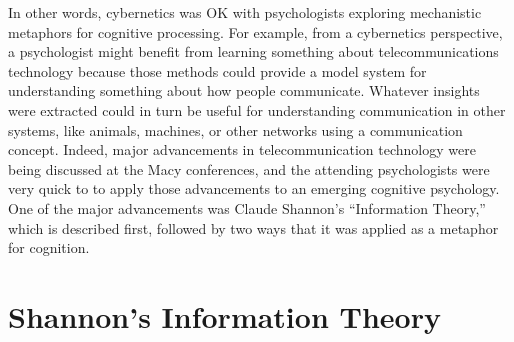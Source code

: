 \documentclass[
  oneside,
  12pt]{crumpbook}
\begin{document}
In other words, cybernetics was OK with psychologists exploring mechanistic metaphors for cognitive processing. For example, from a cybernetics perspective, a psychologist might benefit from learning something about telecommunications technology because those methods could provide a model system for understanding something about how people communicate. Whatever insights were extracted could in turn be useful for understanding communication in other systems, like animals, machines, or other networks using a communication concept. Indeed, major advancements in telecommunication technology were being discussed at the Macy conferences, and the attending psychologists were very quick to to apply those advancements to an emerging cognitive psychology. One of the major advancements was Claude Shannon's ``Information Theory,'' which is described first, followed by two ways that it was applied as a metaphor for cognition.

\hypertarget{shannons-information-theory}{%
\section{Shannon's Information Theory}\label{shannons-information-theory}}
\end{document}
